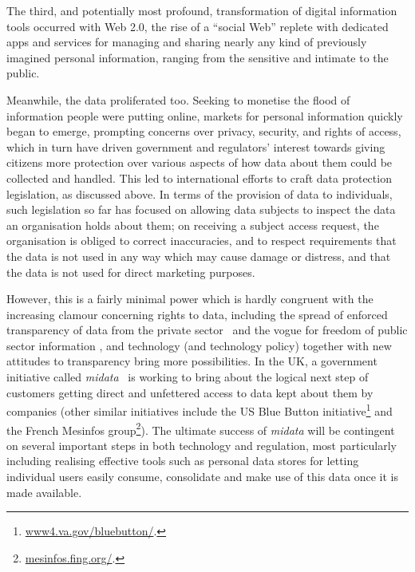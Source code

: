 \documentclass[graybox]{svmult}
\begin{document}


The third, and potentially most profound, transformation of digital information tools occurred with Web 2.0, the rise of a ``social Web'' replete with dedicated apps and services for managing and sharing nearly any kind of previously imagined personal information, ranging from the sensitive and intimate to the public.  

Meanwhile, the data proliferated too. Seeking to monetise the flood of information people were putting online, markets for personal information quickly began to emerge, prompting concerns over privacy, security, and rights of access, which in turn have driven government and regulators’ interest towards giving citizens more protection over various aspects of how data about them could be collected and handled.  This led to international efforts to craft data protection legislation, as discussed above.  In terms of the provision of data to individuals, such legislation so far has focused on allowing data subjects to inspect the data an organisation holds about them; on receiving a subject access request, the organisation is obliged to correct inaccuracies, and to respect requirements that the data is not used in any way which may cause damage or distress, and that the data is not used for direct marketing purposes.

However, this is a fairly minimal power which is hardly congruent with the increasing clamour concerning rights to data, including the spread of enforced transparency of data from the private sector~\cite{fung2007} and the vogue for freedom of public sector information \cite{ohara2014}, and technology (and technology policy) together with new attitudes to transparency bring more possibilities. In the UK, a government initiative called \emph{midata}~\cite{midata} is working to bring about the logical next step of customers getting direct and unfettered access to data kept about them by companies (other similar initiatives include the US Blue Button initiative\footnote{\url{www4.va.gov/bluebutton/}.} and the French Mesinfos group\footnote{\url{mesinfos.fing.org/}.}).  The ultimate success of \emph{midata} will be contingent on several important steps in both technology and regulation, most particularly including realising effective tools such as personal data stores for letting individual users easily consume, consolidate and make use of this data once it is made available.
\end{document}
